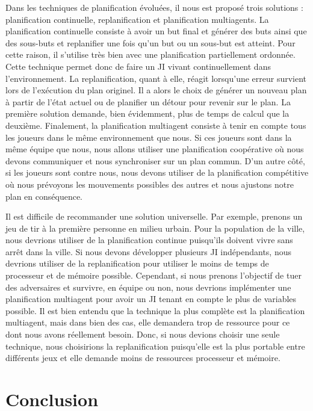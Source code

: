 \documentclass[12pt,letterpaper]{article}
\begin{document}
Dans les techniques de planification évoluées, il nous est proposé trois solutions : planification continuelle, replanification et planification multiagents. La planification continuelle consiste à avoir un but final et générer des buts ainsi que des sous-buts et replanifier une fois qu'un but ou un sous-but est atteint. Pour cette raison, il s'utilise très bien avec une planification partiellement ordonnée. Cette technique permet donc de faire un JI vivant continuellement dans l'environnement. La replanification, quant à elle, réagit lorsqu'une erreur survient lors de l'exécution du plan originel. Il a alors le choix de générer un nouveau plan à partir de l'état actuel ou de planifier un détour pour revenir sur le plan. La première solution demande, bien évidemment, plus de temps de calcul que la deuxième. Finalement, la planification multiagent consiste à tenir en compte tous les joueurs dans le même environnement que nous. Si ces joueurs sont dans la même équipe que nous, nous allons utiliser une planification coopérative où nous devons communiquer et nous synchroniser sur un plan commun. D'un autre côté, si les joueurs sont contre nous, nous devons utiliser de la planification compétitive où nous prévoyons les mouvements possibles des autres et nous ajustons notre plan en conséquence.

Il est difficile de recommander une solution universelle. Par exemple, prenons un jeu de tir à la première personne en milieu urbain. Pour la population de la ville, nous devrions utiliser de la planification continue puisqu'ils doivent vivre sans arrêt dans la ville. Si nous devons développer plusieurs JI indépendants, nous devrions utiliser de la replanification pour utiliser le moins de temps de processeur et de mémoire possible. Cependant, si nous prenons l'objectif de tuer des adversaires et survivre, en équipe ou non, nous devrions implémenter une planification multiagent pour avoir un JI tenant en compte le plus de variables possible. Il est bien entendu que la technique la plus complète est la planification multiagent, mais dans bien des cas, elle demandera trop de ressource pour ce dont nous avons réellement besoin. Donc, si nous devions choisir une seule technique, nous choisirions la replanification puisqu'elle est la plus portable entre différents jeux et elle demande moins de ressources processeur et mémoire.

\section{Conclusion}
\end{document}
